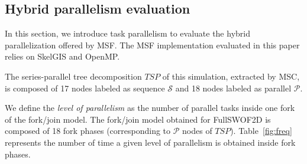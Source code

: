 %
%

\subsection{Hybrid parallelism evaluation}

In this section, we introduce task parallelism to evaluate the hybrid parallelization offered by MSF. The MSF implementation evaluated in this paper relies on SkelGIS and OpenMP.

The series-parallel tree decomposition $TSP$ of this simulation, extracted by MSC, is composed of 17 nodes labeled as sequence $\mathcal{S}$ and 18 nodes labeled as parallel $\mathcal{P}$. 

We define the \emph{level of parallelism} as the number of parallel tasks inside one fork of the fork/join model. The fork/join model obtained for FullSWOF2D is composed of 18 fork phases (corresponding to $\mathcal{P}$ nodes of $TSP$). Table~\ref{fig:freq} represents the number of time a given level of parallelism is obtained inside fork phases.

